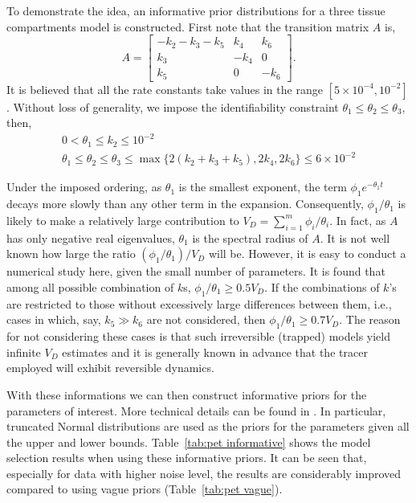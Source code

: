 To demonstrate the idea, an informative prior distributions for a three
tissue compartments model is constructed. First note that the transition
matrix $A$ is,
\begin{equation}
  A = \begin{bmatrix}
    - k_2 - k_3 - k_5 & k_4  & k_6 \\
    k_3               & -k_4 & 0   \\
    k_5               & 0    & -k_6
  \end{bmatrix}.
\end{equation}
It is believed that all the rate constants take values in the range $[5
\times 10^{-4}, 10^{-2}]$. Without loss of generality, we impose the
identifiability constraint $\theta_1 \leq \theta_2 \leq \theta_3$, then,
\begin{gather}
  0 < \theta_1 \le k_2 \le 10^{-2} \\
  \theta_1 \leq \theta_2 \leq \theta_3 \leq \max\{2(k_2 + k_3 + k_5), 2k_4,
  2k_6\} \le 6 \times 10^{-2}
\end{gather}

Under the imposed ordering, as $\theta_1$ is the smallest exponent, the term
$\phi_1e^{-\theta_1 t}$ decays more slowly than any other term in the
expansion. Consequently, $\phi_1/\theta_1$ is likely to make a relatively
large contribution to $V_D = \sum_{i=1}^m \phi_i/\theta_i$. In fact, as $A$
has only negative real eigenvalues, $\theta_1$ is the spectral radius of $A$.
It is not well known how large the ratio $(\phi_1/\theta_1)/V_D$ will be.
However, it is easy to conduct a numerical study here, given the small number
of parameters. It is found that among all possible combination of $k$s,
$\phi_1/ \theta_1 \ge 0.5 V_D$. If the combinations of $k$'s are restricted to
those without excessively large differences between them, i.e., cases in
which, say, $k_5 \gg k_6$ are not considered, then $\phi_1/\theta_1 \ge 0.7
V_D$. The reason for not considering these cases is that such irreversible
(trapped) models yield infinite $V_D$ estimates and it is generally known in
advance that the tracer employed will exhibit reversible dynamics.

With these informations we can then construct informative priors for the
parameters of interest. More technical details can be found in
\cite{Zhou2013}. In particular, truncated Normal distributions are used as the
priors for the parameters given all the upper and lower bounds.
Table~\ref{tab:pet informative} shows the model selection results when using
these informative priors. It can be seen that, especially for data with higher
noise level, the results are considerably improved compared to using vague
priors (Table~\ref{tab:pet vague}).

